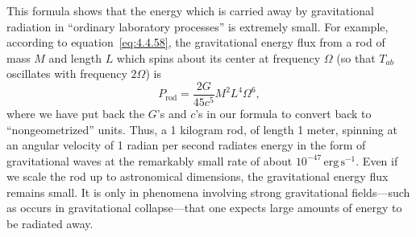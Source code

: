 This formula shows that the energy which is carried away by gravitational radiation
in ``ordinary laboratory processes'' is extremely small. For example, according to
equation~\eqref{eq:4.4.58}, the gravitational energy flux from a rod of mass \(M\)
and length \(L\) which spins about its center at frequency \(\Omega\) (so that
\(T_{ab}\) oscillates with frequency \(2\Omega\)) is
\begin{equation}
  P_{\mathrm{rod}}=\frac{2G}{45c^5}M^2L^4\Omega^6 ,
  \tag{4.4.60}\label{eq:4.4.60}
\end{equation}
where we have put back the \(G\)'s and \(c\)'s in our formula to convert back to
``nongeometrized'' units. Thus, a 1 kilogram rod, of length 1 meter, spinning at an
angular velocity of 1 radian per second radiates energy in the form of gravitational
waves at the remarkably small rate of about \(10^{-47}\,\mathrm{erg\,s^{-1}}\).
Even if we scale the rod up to astronomical dimensions, the gravitational energy
flux remains small. It is only in phenomena involving strong gravitational
fields---such as occurs in gravitational collapse---that one expects large amounts of
energy to be radiated away.

